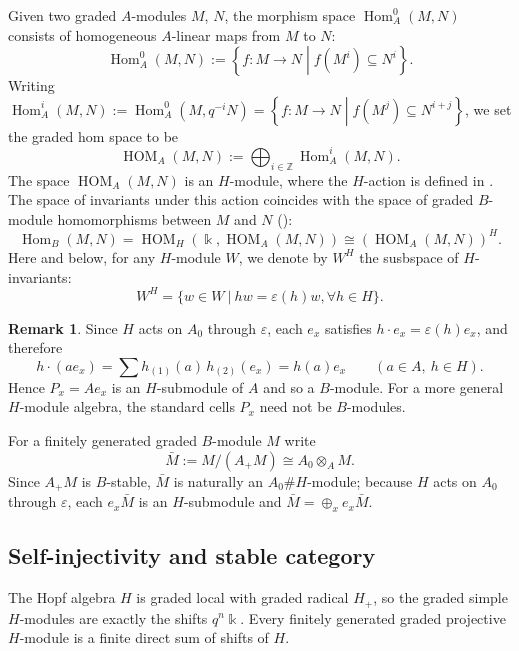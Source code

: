 \documentclass[11pt]{article}
\theoremstyle{definition}
\newtheorem{rem}[thm]{Remark}
\numberwithin{equation}{section}
\newcommand{\kk}{\Bbbk}
\newcommand{\Hom}{\operatorname{Hom}}
\newcommand{\HOM}{\operatorname{HOM}}
\begin{document}
Given two graded $A$-modules $M$, $N$, the morphism space $\Hom_A^0(M,N)$ consists of homogeneous $A$-linear maps from $M$ to $N$:
\[
\Hom_A^0(M,N):=\left\lbrace f:M\to N\middle| f(M^i)\subseteq N^i\right\rbrace.
\] 
Writing $\Hom^i_A (M,N):=\Hom^0_A(M,q^{-i}N)=\left\lbrace f:M\to N\middle| f(M^j)\subseteq N^{i+j}\right\rbrace$, we set the graded hom space to be
\[
\HOM_A(M,N):=\bigoplus_{i\in \mathbb{Z}} \Hom^i_A (M,N).
\]
The space $\HOM_A(M,N)$ is an $H$-module, where the $H$-action is defined in \cite[Definition 5.1]{QYHopf}. The space of invariants under this action coincides with the space of graded $B$-module homomorphisms between $M$ and $N$ (\cite[Lemma 5.2]{QYHopf}):
\begin{equation}\label{eq:H-invariants-in-HOM}
    \Hom_B(M,N)=\HOM_H(\Bbbk, \HOM_A(M,N)) \cong (\HOM_A(M,N))^H.
\end{equation}
Here and below, for any $H$-module $W$, we denote by $W^H$ the susbspace of $H$-invariants:
\begin{equation}\label{eq:H-invariants}
    W^H=\{w\in W \ \big| \ hw=\varepsilon (h)w, \forall h \in H\}.
\end{equation}

\begin{rem}\label{rem:P3}
Since $H$ acts on $A_0$ through $\varepsilon$, each $e_x$ satisfies $h\cdot e_x=\varepsilon(h)e_x$, and therefore
\[
h\cdot(ae_x)=\sum h_{(1)}(a)\,h_{(2)}(e_x)=h(a)e_x
\qquad(a\in A,\ h\in H).
\]
Hence $P_x=Ae_x$ is an $H$-submodule of $A$ and so a $B$-module. For a more general $H$-module algebra, the standard cells $P_x$ need not be $B$-modules.
\end{rem}

For a finitely generated graded $B$-module $M$ write
\begin{equation}\label{eqn:Mbar}
\bar M:=M/(A_+M)\cong A_0\otimes_AM .
\end{equation}
Since $A_+M$ is $B$-stable, $\bar M$ is naturally an $A_0\# H$-module; because $H$ acts on $A_0$ through $\varepsilon$, each $e_x\bar M$ is an $H$-submodule and $\bar M=\oplus_{x}e_x\bar M$.

\subsection{Self-injectivity and stable category}
The Hopf algebra $H$ is graded local with graded radical $H_{+}$, so the graded simple $H$-modules are exactly the shifts $q^n\kk$. Every finitely generated graded projective $H$-module is a finite direct sum of shifts of $H$.
\end{document}
